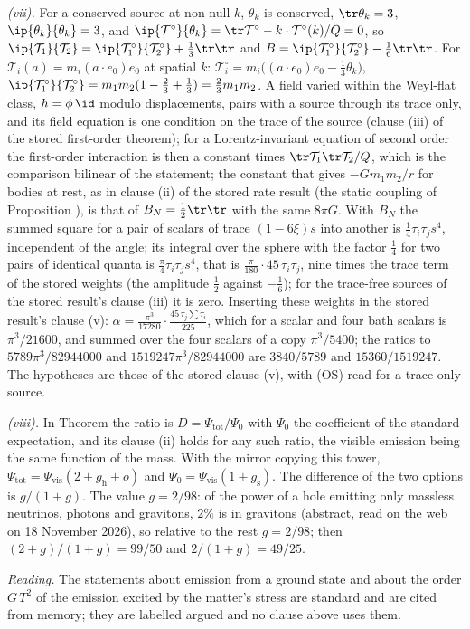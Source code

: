 \emph{(vii).} For a conserved source at non-null $k$, $\theta_{k}$ is conserved, $\tr\theta_{k} = 3$, $\ip{\theta_{k}}{\theta_{k}} = 3$, and $\ip{\mathcal{T}^{\circ}}{\theta_{k}} = \tr\mathcal{T}^{\circ} - k \cdot \mathcal{T}^{\circ}(k)/Q = 0$, so $\ip{\mathcal{T}_{1}}{\mathcal{T}_{2}} = \ip{\mathcal{T}_{1}^{\circ}}{\mathcal{T}_{2}^{\circ}} + \tfrac13\tr\tr$ and $B = \ip{\mathcal{T}_{1}^{\circ}}{\mathcal{T}_{2}^{\circ}} - \tfrac16\tr\tr$. For $\mathcal{T}_{i}(a) = m_{i}(a \cdot e_{0})e_{0}$ at spatial $k$: $\mathcal{T}^{\circ}_{i} = m_{i}\bigl((a \cdot e_{0})e_{0} - \tfrac13\theta_{k}\bigr)$, $\ip{\mathcal{T}_{1}^{\circ}}{\mathcal{T}_{2}^{\circ}} = m_{1}m_{2}(1 - \tfrac23 + \tfrac13) = \tfrac23 m_{1}m_{2}$. A field varied within the Weyl-flat class, $h = \phi\,\id$ modulo displacements, pairs with a source through its trace only, and its field equation is one condition on the trace of the source (clause (iii) of the stored first-order theorem); for a Lorentz-invariant equation of second order the first-order interaction is then a constant times $\tr\mathcal{T}_{1}\tr\mathcal{T}_{2}/Q$, which is the comparison bilinear of the statement; the constant that gives $-Gm_{1}m_{2}/r$ for bodies at rest, as in clause (ii) of the stored rate result (the static coupling of Proposition ), is that of $B_{N} = \tfrac12\tr\tr$ with the same $8\pi G$. With $B_{N}$ the summed square for a pair of scalars of trace $(1 - 6\xi)s$ into another is $\tfrac14\tau_{i}\tau_{j}s^{4}$, independent of the angle; its integral over the sphere with the factor $\tfrac14$ for two pairs of identical quanta is $\tfrac{\pi}{4}\tau_{i}\tau_{j}s^{4}$, that is $\tfrac{\pi}{180}\cdot 45\,\tau_{i}\tau_{j}$, nine times the trace term of the stored weights (the amplitude $\tfrac12$ against $-\tfrac16$); for the trace-free sources of the stored result's clause (iii) it is zero. Inserting these weights in the stored result's clause (v): $\alpha = \tfrac{\pi^{3}}{17280}\cdot\tfrac{45\,\tau_{j}\sum\tau_{i}}{225}$, which for a scalar and four bath scalars is $\pi^{3}/21600$, and summed over the four scalars of a copy $\pi^{3}/5400$; the ratios to $5789\pi^{3}/82944000$ and $1519247\pi^{3}/82944000$ are $3840/5789$ and $15360/1519247$. The hypotheses are those of the stored clause (v), with (OS) read for a trace-only source.

\emph{(viii).} In Theorem  the ratio is $D = \Psi_{\mathrm{tot}}/\Psi_{0}$ with $\Psi_{0}$ the coefficient of the standard expectation, and its clause (ii) holds for any such ratio, the visible emission being the same function of the mass. With the mirror copying this tower, $\Psi_{\mathrm{tot}} = \Psi_{\mathrm{vis}}(2 + g_{\mathrm{h}} + o)$ and $\Psi_{0} = \Psi_{\mathrm{vis}}(1 + g_{\mathrm{s}})$. The difference of the two options is $g/(1 + g)$. The value $g = 2/98$: of the power of a hole emitting only massless neutrinos, photons and gravitons, $2\%$ is in gravitons \cite{Page1976} (abstract, read on the web on 18 November 2026), so relative to the rest $g = 2/98$; then $(2 + g)/(1 + g) = 99/50$ and $2/(1 + g) = 49/25$.

\emph{Reading.} The statements about emission from a ground state and about the order $G\,T^{2}$ of the emission excited by the matter's stress are standard and are cited from memory; they are labelled argued and no clause above uses them.
